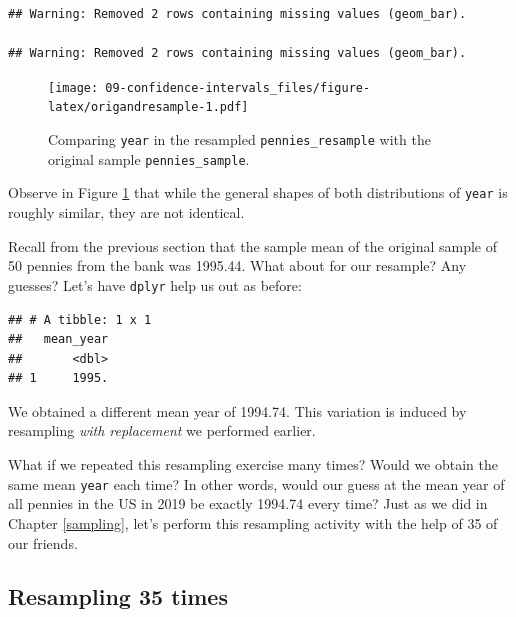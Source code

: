 \documentclass[
]{book}
\newenvironment{Shaded}{\begin{snugshade}}{\end{snugshade}}
\newcommand{\DataTypeTok}[1]{\textcolor[rgb]{0.13,0.29,0.53}{#1}}
\newcommand{\KeywordTok}[1]{\textcolor[rgb]{0.13,0.29,0.53}{\textbf{#1}}}
\newcommand{\NormalTok}[1]{#1}
\newcommand{\OperatorTok}[1]{\textcolor[rgb]{0.81,0.36,0.00}{\textbf{#1}}}
\newcommand{\StringTok}[1]{\textcolor[rgb]{0.31,0.60,0.02}{#1}}
\begin{document}
\begin{verbatim}
## Warning: Removed 2 rows containing missing values (geom_bar).

## Warning: Removed 2 rows containing missing values (geom_bar).
\end{verbatim}

\begin{figure}
\centering
\texttt{[image: 09-confidence-intervals\_files/figure-latex/origandresample-1.pdf]}
\caption{\label{fig:origandresample}Comparing \texttt{year} in the resampled \texttt{pennies\_resample} with the original sample \texttt{pennies\_sample}.}
\end{figure}

Observe in Figure \ref{fig:origandresample} that while the general shapes of both distributions of \texttt{year} is roughly similar, they are not identical.

Recall from the previous section that the sample mean of the original sample of 50 pennies from the bank was 1995.44. What about for our resample? Any guesses? Let's have \texttt{dplyr} help us out as before:

\begin{Shaded}
\end{Shaded}

\begin{verbatim}
## # A tibble: 1 x 1
##   mean_year
##       <dbl>
## 1     1995.
\end{verbatim}

We obtained a different mean year of 1994.74. This variation is induced by resampling \emph{with replacement} we performed earlier.

What if we repeated this resampling exercise many times? Would we obtain the same mean \texttt{year} each time? In other words, would our guess at the mean year of all pennies in the US in 2019 be exactly 1994.74 every time? Just as we did in Chapter \ref{sampling}, let's perform this resampling activity with the help of 35 of our friends.

\hypertarget{student-resamples}{%
\subsection{Resampling 35 times}\label{student-resamples}}
\end{document}
